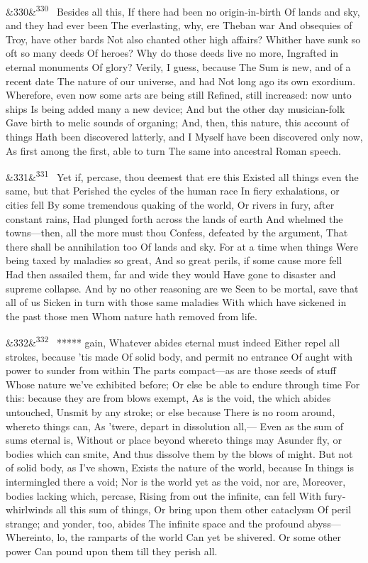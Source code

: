 \documentclass[12pt]{article}
\newcommand{\para}[1][]{\par\noindent\ifx&#1&\else\textsuperscript{\footnotesize #1}~\fi}
\begin{document}
\para[330] Besides all this, If there had been no origin-in-birth Of lands and sky, and they had ever been The everlasting, why, ere Theban war And obsequies of Troy, have other bards Not also chanted other high affairs? Whither have sunk so oft so many deeds Of heroes? Why do those deeds live no more, Ingrafted in eternal monuments Of glory? Verily, I guess, because The Sum is new, and of a recent date The nature of our universe, and had Not long ago its own exordium. Wherefore, even now some arts are being still Refined, still increased: now unto ships Is being added many a new device; And but the other day musician-folk Gave birth to melic sounds of organing; And, then, this nature, this account of things Hath been discovered latterly, and I Myself have been discovered only now, As first among the first, able to turn The same into ancestral Roman speech.

\para[331] Yet if, percase, thou deemest that ere this Existed all things even the same, but that Perished the cycles of the human race In fiery exhalations, or cities fell By some tremendous quaking of the world, Or rivers in fury, after constant rains, Had plunged forth across the lands of earth And whelmed the towns---then, all the more must thou Confess, defeated by the argument, That there shall be annihilation too Of lands and sky. For at a time when things Were being taxed by maladies so great, And so great perils, if some cause more fell Had then assailed them, far and wide they would Have gone to disaster and supreme collapse. And by no other reasoning are we Seen to be mortal, save that all of us Sicken in turn with those same maladies With which have sickened in the past those men Whom nature hath removed from life.

\para[332] ***** gain, Whatever abides eternal must indeed Either repel all strokes, because 'tis made Of solid body, and permit no entrance Of aught with power to sunder from within The parts compact---as are those seeds of stuff Whose nature we've exhibited before; Or else be able to endure through time For this: because they are from blows exempt, As is the void, the which abides untouched, Unsmit by any stroke; or else because There is no room around, whereto things can, As 'twere, depart in dissolution all,--- Even as the sum of sums eternal is, Without or place beyond whereto things may Asunder fly, or bodies which can smite, And thus dissolve them by the blows of might. But not of solid body, as I've shown, Exists the nature of the world, because In things is intermingled there a void; Nor is the world yet as the void, nor are, Moreover, bodies lacking which, percase, Rising from out the infinite, can fell With fury-whirlwinds all this sum of things, Or bring upon them other cataclysm Of peril strange; and yonder, too, abides The infinite space and the profound abyss--- Whereinto, lo, the ramparts of the world Can yet be shivered. Or some other power Can pound upon them till they perish all.
\end{document}
